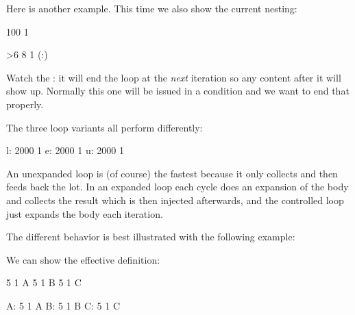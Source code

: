 \startpacked \getbuffer \stoppacked

Here is another example. This time we also show the current nesting:

\startbuffer
{} 100 1 {%
    \ifnum\currentloopiterator>6\relax
        \quitloop
    \else
        [\number\currentloopnesting:\number\currentloopiterator]
         8 1 {%
            (\number\currentloopnesting:\number\currentloopiterator)
        }\par
    \fi
}
\stopbuffer

\typebuffer[option=TEX]

Watch the \type {\quitloop}: it will end the loop at the {\em next} iteration so
any content after it will show up. Normally this one will be issued in a
condition and we want to end that properly.

\startpacked \getbuffer \stoppacked

The three loop variants all perform differently:

\startbuffer
l: { 2000 1 {\relax}} %
  \elapsedtime
e: { 2000 1 {\relax}} %
  \elapsedtime
u: { 2000 1 {\relax}} %
  \elapsedtime
\stopbuffer

\typebuffer[option=TEX]

An unexpanded loop is (of course) the fastest because it only collects and then
feeds back the lot. In an expanded loop each cycle does an expansion of the body
and collects the result which is then injected afterwards, and the controlled
loop just expands the body each iteration.

\startlines\tttf \getbuffer \stoplines

The different behavior is best illustrated with the following example:

\startbuffer[definition]
\edef{} %
\edef\TestB{\expandedloop        1 5 1 {B}}
\edef\TestC{\unexpandedloop      1 5 1 {C\relax}}
\stopbuffer

\typebuffer[definition][option=TEX]

We can show the effective definition:

\startbuffer[example]
\meaningasis\TestA
\meaningasis\TestB
\meaningasis\TestC

A: \TestA
B: \TestB
C: \TestC
\stopbuffer

\typebuffer[example][option=TEX]


